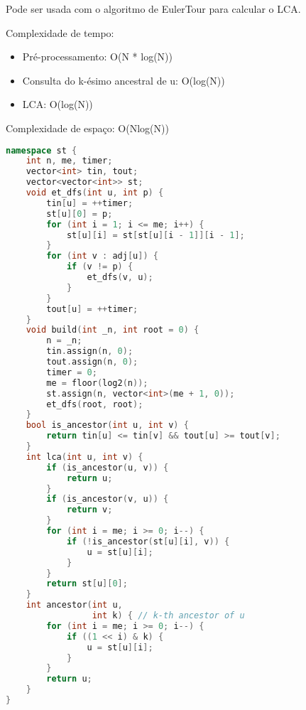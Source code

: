 \documentclass[11pt, a4paper, oneside]{book}
\begin{document}
Pode ser usada com o algoritmo de EulerTour para calcular o LCA.



Complexidade de tempo:



\begin{itemize}
\item Pré-processamento: O(N * log(N))
\item Consulta do k-ésimo ancestral de u: O(log(N))
\item LCA: O(log(N))
\end{itemize}



Complexidade de espaço: O(Nlog(N))

\hfill

\begin{multicols}{2}
\begin{lstlisting}[language=C++]
namespace st {
    int n, me, timer;
    vector<int> tin, tout;
    vector<vector<int>> st;
    void et_dfs(int u, int p) {
        tin[u] = ++timer;
        st[u][0] = p;
        for (int i = 1; i <= me; i++) {
            st[u][i] = st[st[u][i - 1]][i - 1];
        }
        for (int v : adj[u]) {
            if (v != p) {
                et_dfs(v, u);
            }
        }
        tout[u] = ++timer;
    }
    void build(int _n, int root = 0) {
        n = _n;
        tin.assign(n, 0);
        tout.assign(n, 0);
        timer = 0;
        me = floor(log2(n));
        st.assign(n, vector<int>(me + 1, 0));
        et_dfs(root, root);
    }
    bool is_ancestor(int u, int v) {
        return tin[u] <= tin[v] && tout[u] >= tout[v];
    }
    int lca(int u, int v) {
        if (is_ancestor(u, v)) {
            return u;
        }
        if (is_ancestor(v, u)) {
            return v;
        }
        for (int i = me; i >= 0; i--) {
            if (!is_ancestor(st[u][i], v)) {
                u = st[u][i];
            }
        }
        return st[u][0];
    }
    int ancestor(int u,
                 int k) { // k-th ancestor of u
        for (int i = me; i >= 0; i--) {
            if ((1 << i) & k) {
                u = st[u][i];
            }
        }
        return u;
    }
}
\end{lstlisting}
\end{multicols}

\hfill
\end{document}
